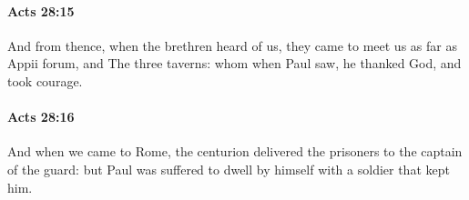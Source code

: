 		\paragraph{Acts 28:15} %
			\label{ACTS-28-15}

			And from thence, when the brethren heard of us, they came to meet us as far as Appii forum, and The three taverns: whom when Paul saw, he thanked God, and took courage.

			\begin{framed}
			\scriptsize
				\begin{compactdesc}
					\item[SBLG] 
				\end{compactdesc}
			\end{framed}

		\paragraph{Acts 28:16} %
			\label{ACTS-28-16}

			And when we came to Rome, the centurion delivered the prisoners to the captain of the guard: but Paul was suffered to dwell by himself with a soldier that kept him.

